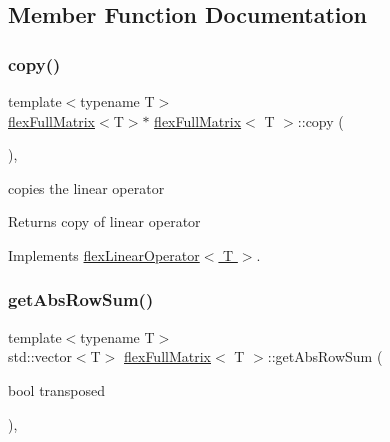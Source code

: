\subsection{Member Function Documentation}
\mbox{\label{classflex_full_matrix_a849d2974a11456c6a23801f51838bc7b}} 
\subsubsection{\texorpdfstring{copy()}{copy()}}
{\footnotesize\ttfamily template$<$typename T$>$ \\
\hyperlink{classflex_full_matrix}{flex\+Full\+Matrix}$<$T$>$$\ast$ \hyperlink{classflex_full_matrix}{flex\+Full\+Matrix}$<$ T $>$\+::copy (\begin{DoxyParamCaption}{ }\end{DoxyParamCaption})\hspace{0.3cm}{\ttfamily [inline]}, {\ttfamily [virtual]}}



copies the linear operator 

\begin{DoxyReturn}{Returns}
copy of linear operator 
\end{DoxyReturn}


Implements \hyperlink{classflex_linear_operator_a7cc1425677cc30fcbd092ffd28d508c9}{flex\+Linear\+Operator$<$ T $>$}.

\mbox{\label{classflex_full_matrix_a911d6b2a452edb8233f56c1e5250855e}} 
\subsubsection{\texorpdfstring{get\+Abs\+Row\+Sum()}{getAbsRowSum()}}
{\footnotesize\ttfamily template$<$typename T$>$ \\
std\+::vector$<$T$>$ \hyperlink{classflex_full_matrix}{flex\+Full\+Matrix}$<$ T $>$\+::get\+Abs\+Row\+Sum (\begin{DoxyParamCaption}\item[{bool}]{transposed }\end{DoxyParamCaption})\hspace{0.3cm}{\ttfamily [inline]}, {\ttfamily [virtual]}}



